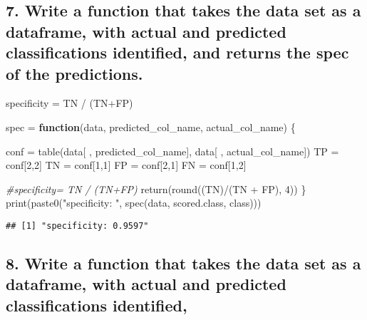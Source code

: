\documentclass[
]{article}
\newenvironment{Shaded}{\begin{snugshade}}{\end{snugshade}}
\newcommand{\CommentTok}[1]{\textcolor[rgb]{0.56,0.35,0.01}{\textit{#1}}}
\newcommand{\ControlFlowTok}[1]{\textcolor[rgb]{0.13,0.29,0.53}{\textbf{#1}}}
\newcommand{\DecValTok}[1]{\textcolor[rgb]{0.00,0.00,0.81}{#1}}
\newcommand{\FunctionTok}[1]{\textcolor[rgb]{0.00,0.00,0.00}{#1}}
\newcommand{\NormalTok}[1]{#1}
\newcommand{\OtherTok}[1]{\textcolor[rgb]{0.56,0.35,0.01}{#1}}
\newcommand{\SpecialCharTok}[1]{\textcolor[rgb]{0.00,0.00,0.00}{#1}}
\newcommand{\StringTok}[1]{\textcolor[rgb]{0.31,0.60,0.02}{#1}}
\begin{document}
\hypertarget{write-a-function-that-takes-the-data-set-as-a-dataframe-with-actual-and-predicted-classifications-identified-and-returns-the-spec-of-the-predictions.}{%
\subsection{7. Write a function that takes the data set as a dataframe,
with actual and predicted classifications identified, and returns the
spec of the
predictions.}\label{write-a-function-that-takes-the-data-set-as-a-dataframe-with-actual-and-predicted-classifications-identified-and-returns-the-spec-of-the-predictions.}}

specificity = TN / (TN+FP)

\begin{Shaded}
\begin{Highlighting}[]
\NormalTok{spec }\OtherTok{=} \ControlFlowTok{function}\NormalTok{(data, predicted\_col\_name, actual\_col\_name) \{}
  
\NormalTok{  conf }\OtherTok{=} \FunctionTok{table}\NormalTok{(data[ , predicted\_col\_name], data[ , actual\_col\_name])}
\NormalTok{  TP }\OtherTok{=}\NormalTok{ conf[}\DecValTok{2}\NormalTok{,}\DecValTok{2}\NormalTok{]}
\NormalTok{  TN }\OtherTok{=}\NormalTok{ conf[}\DecValTok{1}\NormalTok{,}\DecValTok{1}\NormalTok{]}
\NormalTok{  FP }\OtherTok{=}\NormalTok{ conf[}\DecValTok{2}\NormalTok{,}\DecValTok{1}\NormalTok{]}
\NormalTok{  FN }\OtherTok{=}\NormalTok{ conf[}\DecValTok{1}\NormalTok{,}\DecValTok{2}\NormalTok{]}
  
  \CommentTok{\#specificity= TN / (TN+FP)}
  \FunctionTok{return}\NormalTok{(}\FunctionTok{round}\NormalTok{((TN)}\SpecialCharTok{/}\NormalTok{(TN }\SpecialCharTok{+}\NormalTok{ FP), }\DecValTok{4}\NormalTok{))}
\NormalTok{\}}
\FunctionTok{print}\NormalTok{(}\FunctionTok{paste0}\NormalTok{(}\StringTok{"specificity: "}\NormalTok{, }\FunctionTok{spec}\NormalTok{(data, }\StringTok{\textquotesingle{}scored.class\textquotesingle{}}\NormalTok{, }\StringTok{\textquotesingle{}class\textquotesingle{}}\NormalTok{)))}
\end{Highlighting}
\end{Shaded}

\begin{verbatim}
## [1] "specificity: 0.9597"
\end{verbatim}

\hypertarget{write-a-function-that-takes-the-data-set-as-a-dataframe-with-actual-and-predicted-classifications-identified-2}{%
\subsection{8. Write a function that takes the data set as a dataframe,
with actual and predicted classifications
identified,}\label{write-a-function-that-takes-the-data-set-as-a-dataframe-with-actual-and-predicted-classifications-identified-2}}
\end{document}
